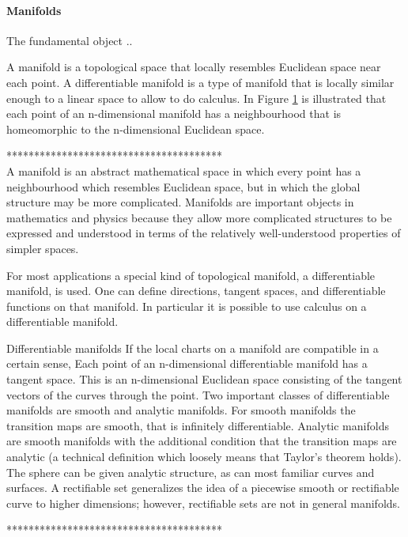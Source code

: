 \paragraph{Manifolds}
The fundamental object ..

A manifold is a topological space that locally resembles Euclidean space near each point. A differentiable manifold is a type of manifold that is locally similar enough to a linear space to allow to do calculus. In Figure \ref{fig:mod.manifold} is illustrated that each point of an n-dimensional manifold has a neighbourhood that is homeomorphic to the n-dimensional Euclidean space.


***************************************\\
A manifold is an abstract mathematical space in which every point has a neighbourhood which resembles Euclidean space, but in which the global structure may be more complicated.
Manifolds are important objects in mathematics and physics because they allow more complicated structures to be expressed and understood in terms of the relatively well-understood properties of simpler spaces.

For most applications a special kind of topological manifold, a differentiable manifold, is used. One can define directions, tangent spaces, and differentiable functions on that manifold. In particular it is possible to use calculus on a differentiable manifold.

Differentiable manifolds
If the local charts on a manifold are compatible in a certain sense,  Each point of an n-dimensional differentiable manifold has a tangent space. This is an n-dimensional Euclidean space consisting of the tangent vectors of the curves through the point.
Two important classes of differentiable manifolds are smooth and analytic manifolds. For smooth manifolds the transition maps are smooth, that is infinitely differentiable. Analytic manifolds are smooth manifolds with the additional condition that the transition maps are analytic (a technical definition which loosely means that Taylor's theorem holds). The sphere can be given analytic structure, as can most familiar curves and surfaces.
A rectifiable set generalizes the idea of a piecewise smooth or rectifiable curve to higher dimensions; however, rectifiable sets are not in general manifolds.

***************************************\\


\begin{figure}[h!]
	\centering
	\caption{\label{fig:mod.manifold}}
\end{figure}		

